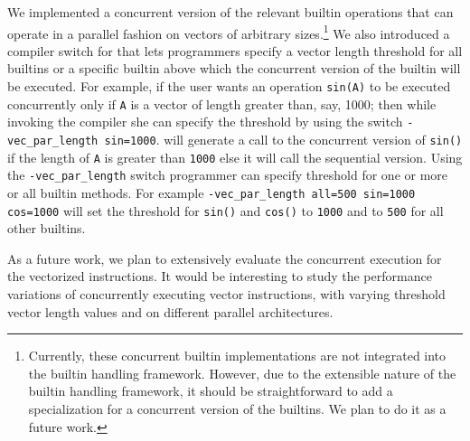We implemented a concurrent version of the relevant builtin operations that can
operate in a parallel fashion on vectors of arbitrary sizes.\footnote{Currently,
these concurrent builtin implementations are not integrated into the builtin
handling framework. However, due to the extensible nature of the builtin
handling framework, it should be straightforward to add a specialization for
a concurrent version of the builtins. We plan to do it as a future work.} We also
introduced a compiler switch for \mixten that lets programmers specify a
vector length threshold for all builtins or a specific builtin above
which the concurrent version of the builtin will be executed. For
example, if the user wants an operation \verb|sin(A)| to be executed
concurrently only if \verb|A| is a vector of length greater than, say,
1000; then while invoking the \mixten compiler she can specify the
threshold by using the switch \verb|-vec_par_length sin=1000|. \mixten
will generate a call to the concurrent version of \verb|sin()| if the
length of \verb|A| is greater than \verb|1000| else it will call the
sequential version. Using the \verb|-vec_par_length| switch programmer
can specify threshold for one or more or all builtin methods. For
example \verb|-vec_par_length all=500 sin=1000 cos=1000| will set the
threshold for \verb|sin()| and \verb|cos()| to \verb|1000| and to
\verb|500| for all other builtins. 

As a future work, we plan to extensively evaluate the concurrent execution for
the vectorized instructions. It would be interesting to study the performance 
variations of concurrently executing vector instructions, with varying
threshold vector length values and on different parallel architectures.   



